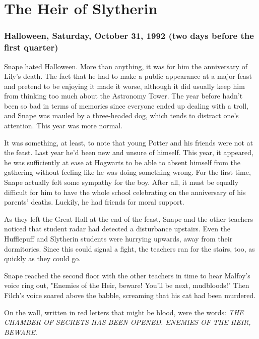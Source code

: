 
\chapter{The Heir of Slytherin}

\subsection{Halloween, Saturday, October 31, 1992 (two days before the first quarter)}

Snape hated Halloween. More than anything, it was for him the anniversary of Lily's death. The fact that he had to make a public appearance at a major feast and pretend to be enjoying it made it worse, although it did usually keep him from thinking too much about the Astronomy Tower. The year before hadn't been so bad in terms of memories since everyone ended up dealing with a troll, and Snape was mauled by a three-headed dog, which tends to distract one's attention. This year was more normal.

It was something, at least, to note that young Potter and his friends were not at the feast. Last year he'd been new and unsure of himself. This year, it appeared, he was sufficiently at ease at Hogwarts to be able to absent himself from the gathering without feeling like he was doing something wrong. For the first time, Snape actually felt some sympathy for the boy. After all, it must be equally difficult for him to have the whole school celebrating on the anniversary of his parents' deaths. Luckily, he had friends for moral support.

As they left the Great Hall at the end of the feast, Snape and the other teachers noticed that student radar had detected a disturbance upstairs. Even the Hufflepuff and Slytherin students were hurrying upwards, away from their dormitories. Since this could signal a fight, the teachers ran for the stairs, too, as quickly as they could go.

Snape reached the second floor with the other teachers in time to hear Malfoy's voice ring out, "Enemies of the Heir, beware! You'll be next, mudbloods!" Then Filch's voice soared above the babble, screaming that his cat had been murdered.

On the wall, written in red letters that might be blood, were the words: \emph{THE CHAMBER OF SECRETS HAS BEEN OPENED. ENEMIES OF THE HEIR, BEWARE}.


